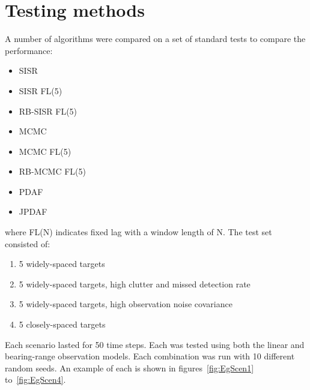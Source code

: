 \section{Testing methods}
A number of algorithms were compared on a set of standard tests to compare the performance:

\begin{itemize}
	\item SISR
	\item SISR FL(5)
	\item RB-SISR FL(5)
	\item MCMC
	\item MCMC FL(5)
	\item RB-MCMC FL(5)
	\item PDAF
	\item JPDAF
\end{itemize}

where FL(N) indicates fixed lag with a window length of N. The test set consisted of:

\begin{enumerate}
	\item 5 widely-spaced targets
	\item 5 widely-spaced targets, high clutter and missed detection rate
	\item 5 widely-spaced targets, high observation noise covariance
	\item 5 closely-spaced targets
\end{enumerate}

Each scenario lasted for 50 time steps. Each was tested using both the linear and bearing-range observation models. Each combination was run with 10 different random seeds. An example of each is shown in figures~\ref{fig:EgScen1} to~\ref{fig:EgScen4}.


